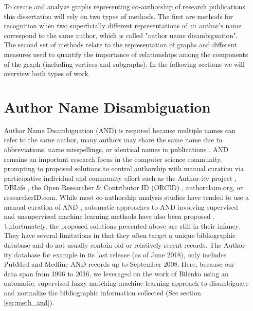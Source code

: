 

\label{chapter2}
To create and analyze graphs representing co-authorship of research publications this dissertation will rely on two types of methods. The first are methods for recognition when two superficially different representations of an author's name correspond to the same author, which is called "author name disambiguation". The second set of methods relate to the representation of graphs and different measures used to quantify the importance of relationships among the components of the graph (including vertices and subgraphs). In the following sections we will overview both types of work.
\section{Author Name Disambiguation}
Author Name Disambiguation (AND) is required because multiple names can refer to the same author, many authors may share the same name due to abbreviations, name misspellings, or identical names in publications \cite{HanNamedisambiguationauthor2005}. %
AND remains an important research focus in the computer science community, prompting to proposed solutions to control authorship with manual curation via participative individual and community effort such as the Author-ity project \cite{TorvikAuthornamedisambiguation2009}, DBLife \cite{DeRoseDBLifecommunityinformation2007}, the Open Researcher \& Contributor ID (ORCID) \cite{HaakORCIDsystemuniquely2012}, authorclaim.org, or researcherID.com. While most co-authorship analysis studies have tended to use a manual curation of AND \cite{SmalheiserAuthornamedisambiguation2009}, automatic approaches to AND involving supervised and unsupervised machine learning methods have also been proposed \cite{ferreira_brief_2012,giles_name_2005}. Unfortunately, the proposed solutions presented above are still in their infancy. They have several limitations in that they often target a unique bibliographic database and do not usually contain old or relatively recent records. The Author-ity database for example in its last release (as of June 2018), only includes PubMed and Medline AND records up to September 2008. Here, because our data span from 1996 to 2016, we leveraged on the work of Bilenko \cite{bilenko_learnable_2006} using an automatic, supervised fuzzy matching machine learning approach to disambiguate and normalize the bibliographic information collected (See section \ref{sec:meth_and}).

